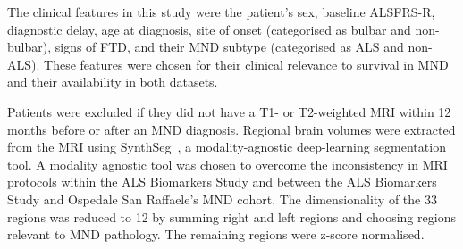 The clinical features in this study were the patient's sex, baseline ALSFRS-R, diagnostic delay, age at diagnosis, site of onset (categorised as bulbar and non-bulbar), signs of FTD, and their MND subtype (categorised as ALS and non-ALS).
These features were chosen for their clinical relevance to survival in MND and their availability in both datasets.

Patients were excluded if they did not have a T1- or T2-weighted MRI within 12 months before or after an MND diagnosis.
Regional brain volumes were extracted from the MRI using SynthSeg~\cite{billotSynthSegDomainRandomisation2021}, a modality-agnostic deep-learning segmentation tool.
A modality agnostic tool was chosen to overcome the inconsistency in MRI protocols within the ALS Biomarkers Study and between the ALS Biomarkers Study and Ospedale San Raffaele's MND cohort.
The dimensionality of the 33 regions was reduced to 12 by summing right and left regions and choosing regions relevant to MND pathology.
The remaining regions were z-score normalised.

